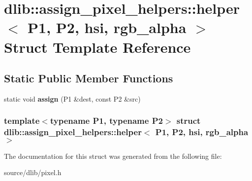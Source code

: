 \hypertarget{structdlib_1_1assign__pixel__helpers_1_1helper_3_01P1_00_01P2_00_01hsi_00_01rgb__alpha_01_4}{
\section{dlib::assign\_\-pixel\_\-helpers::helper$<$ P1, P2, hsi, rgb\_\-alpha $>$ Struct Template Reference}
\label{structdlib_1_1assign__pixel__helpers_1_1helper_3_01P1_00_01P2_00_01hsi_00_01rgb__alpha_01_4}
}
\subsection*{Static Public Member Functions}
\begin{DoxyCompactItemize}
\item 
\hypertarget{structdlib_1_1assign__pixel__helpers_1_1helper_3_01P1_00_01P2_00_01hsi_00_01rgb__alpha_01_4_aacd84ca0877d26a152e1a3394938f3bf}{
static void {\bfseries assign} (P1 \&dest, const P2 \&src)}
\label{structdlib_1_1assign__pixel__helpers_1_1helper_3_01P1_00_01P2_00_01hsi_00_01rgb__alpha_01_4_aacd84ca0877d26a152e1a3394938f3bf}

\end{DoxyCompactItemize}
\subsubsection*{template$<$typename P1, typename P2$>$ struct dlib::assign\_\-pixel\_\-helpers::helper$<$ P1, P2, hsi, rgb\_\-alpha $>$}



The documentation for this struct was generated from the following file:\begin{DoxyCompactItemize}
\item 
source/dlib/pixel.h\end{DoxyCompactItemize}
